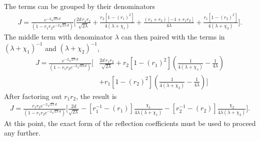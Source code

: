 The terms can be grouped by their denominators 
\begin{align}
  J=\frac{e^{-2\sqrt{2\lambda}d}}{(1-r_1r_2 e^{-2\sqrt{2\lambda}d})}
    \bigg[\frac{2d\,r_1r_2 }{\sqrt{2\lambda}}
  +\frac{r_2 [1 - (r_1)^2]}{4(\lambda+\chi_1)} 
     +\frac{(r_1 +r_2)[-1+r_1r_2]}
    {4\lambda}
    +\frac{r_1[1-(r_2)^2]}{4(\lambda+\chi_2)}\bigg].
  \end{align}
The middle term with denominator $\lambda$ can then paired with the terms in $(\lambda+\chi_1)^{-1}$
and $(\lambda+\chi_2)^{-1}$,
\begin{align}
  J=\frac{e^{-2\sqrt{2\lambda}d}}{(1-r_1r_2 e^{-2\sqrt{2\lambda}d})}
    \bigg[&\frac{2d\,r_1r_2 }{\sqrt{2\lambda}}
    +r_2 [1 - (r_1)^2]\left(\frac{1}{4(\lambda+\chi_1)}-\frac{1}{4\lambda} \right)\nonumber\\
    &+r_1[1-(r_2)^2]\left(\frac{1}{4(\lambda+\chi_2)}-\frac{1}{4\lambda}\right)\bigg]
  \end{align}
After factoring out $r_1r_2$,  the result is
\begin{align}
  J=\frac{r_1r_2e^{-2\sqrt{2\lambda}d}}{(1-r_1r_2 e^{-2\sqrt{2\lambda}d})}
    \bigg[\frac{2d}{\sqrt{2\lambda}}
    -[r_1^{-1} - (r_1)]\frac{\chi_1}{4\lambda(\lambda+\chi_1)}
    -[r_2^{-1}-(r_2)]\frac{\chi_2}{4\lambda(\lambda+\chi_2)}\bigg].
    \label{eq:Jfinal}
  \end{align}
At this point, the exact form of the reflection coefficients must be used to proceed any further.  

